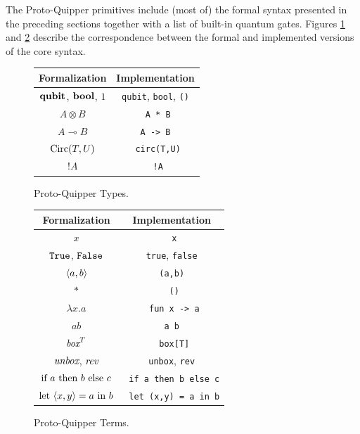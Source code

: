 The Proto-Quipper primitives include (most of) the formal syntax presented 
in the preceding sections together with a list of built-in quantum gates. 
Figures \hyperref[types]{\ref*{types}} and \hyperref[terms]{\ref*{terms}} 
describe the correspondence between the formal and implemented versions of 
the core syntax.

\begin{figure}[!ht]
\begin{center}
\renewcommand{\arraystretch}{1.4}
\begin{tabular}{|c|c|}
  \hline
  \textbf{Formalization}    & \textbf{Implementation} \\\hline
  $\textrm{\bf qubit}$, $\textrm{\bf bool}$, $1$    & \verb#qubit#, \verb#bool#, \verb#()# \\\hline
  $A \otimes B$             & \verb# A * B# \\\hline
  $A \multimap B$           & \verb# A -> B # \\\hline
  $\mathop{\textrm{Circ}}\nolimits(T, U)$              & \verb# circ(T,U)# \\\hline
  ${!} A$                   & \verb# !A# \\\hline
\end{tabular}
\end{center}
\caption{Proto-Quipper Types.}
\label{types}
\end{figure}

\begin{figure}[!ht]
\begin{center}
\renewcommand{\arraystretch}{1.4}
\begin{tabular}{|c|c|}
  \hline
  \textbf{Formalization}          & \textbf{Implementation} \\\hline
  $x$                             & \verb# x# \\\hline
  $\texttt{True}$, $\texttt{False}$               & \verb#true#, \verb#false# \\\hline
  $\langle a, b \rangle$                   & \verb# (a,b) # \\\hline
  $*$                             & \verb# ()# \\\hline
  $\lambda x.a$                   & \verb# fun x -> a# \\\hline
  $a b$                        & \verb#a b# \\\hline
  $\mathop{\textit{box}}\nolimits^T$                       & \verb# box[T]# \\\hline
  $\mathop{\textit{unbox}}\nolimits$, $\mathop{\textit{rev}}\nolimits$                & \verb#unbox#, \verb#rev# \\\hline
  $\textrm{\rm if}~ a ~\textrm{\rm then}~ b ~\textrm{\rm else}~ c$          & \verb# if a then b else c# \\\hline
  $\textrm{\rm let}~ \langle x,y\rangle = a ~\textrm{\rm in}~ b$         & \verb# let (x,y) = a in b# \\\hline
\end{tabular}
\end{center}
\caption{Proto-Quipper Terms.}
\label{terms}
\end{figure}

